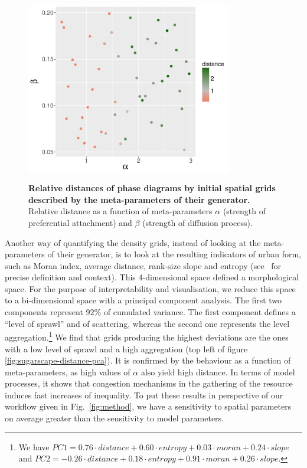 \documentclass[3p,times,procedia]{elsarticle}
\begin{document}
\begin{figure}
\centering
\includegraphics[width=0.8\textwidth]{figures/relativedistance_metaparams}\\
\caption{\textbf{Relative distances of phase diagrams by initial spatial grids described by the meta-parameters of their generator.} Relative distance as a function of meta-parameters $\alpha$ (strength of preferential attachment) and $\beta$ (strength of diffusion process).}
\label{fig:sugarscape-distance-meta}
\end{figure}

Another way of quantifying the density grids, instead of looking at the meta-parameters of their generator, is to look at the resulting indicators of urban form, such as Moran index, average distance, rank-size slope and entropy (see~\cite{LeNechet2015} for precise definition and context). This 4-dimensional space defined a morphological space. For the purpose of interpretability and visualisation, we reduce this space to a bi-dimensional space with a principal component analysis. The first two components represent 92\% of cumulated variance. The first component defines a ``level of sprawl'' and of scattering, whereas the second one represents the level aggregation.\footnote{We have $PC1 = 0.76\cdot distance + 0.60\cdot entropy + 0.03\cdot moran + 0.24\cdot slope$ and $PC2 = -0.26\cdot distance + 0.18\cdot entropy + 0.91\cdot moran + 0.26\cdot slope$.} We find that grids producing the highest deviations are the ones with a low level of sprawl and a high aggregation (top left of figure \ref{fig:sugarscape-distance-pca}). It is confirmed by the behaviour as a function of meta-parameters, as high values of $\alpha$ also yield high distance. In terms of model processes, it shows that congestion mechanisms in the gathering of the resource induces fast increases of inequality. To put these results in perspective of our workflow given in Fig.~\ref{fig:method}, we have a sensitivity to spatial parameters on average greater than the sensitivity to model parameters.
\end{document}
